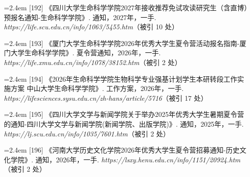 {\vspace{0.6pt}
\vspace{3.5pt}\par
\nopagebreak\vspace{1pt}
\noindent\hangindent=2.4em \label{src:S0245}{\color{cAccent}[192]} 《四川大学生命科学学院2027年接收推荐免试攻读研究生（含直博）预报名通知-生命科学学院》. 通知，2027年，一手. \textit{https://life.scu.edu.cn/info/1063/5455.htm}（被引 10 处）\par
\vspace{0.6pt}
\vspace{3.5pt}\par
\nopagebreak\vspace{1pt}
\noindent\hangindent=2.4em \label{src:S0246}{\color{cAccent}[193]} 《厦门大学生命科学学院2026年优秀大学生夏令营活动报名指南-厦门大学生命科学学院》. 夏令营通知，2026年，一手. \textit{https://life.xmu.edu.cn/info/1078/38152.htm}（被引 2 处）\par
\vspace{0.6pt}
\vspace{3.5pt}\par
\nopagebreak\vspace{1pt}
\noindent\hangindent=2.4em \label{src:S0248}{\color{cAccent}[194]} 《2026年生命科学学院生物科学专业强基计划学生本研转段工作实施方案 \textbar{} 中山大学生命科学学院》. 工作方案，2026年，一手. \textit{https://lifesciences.sysu.edu.cn/zh-hans/article/5716}（被引 17 处）\par
\vspace{0.6pt}
\vspace{3.5pt}\par
\nopagebreak\vspace{1pt}
\noindent\hangindent=2.4em \label{src:S0249}{\color{cAccent}[195]} 《四川大学文学与新闻学院关于举办2025年优秀大学生暑期夏令营的通知-四川大学文学与新闻学院(新闻学院、出版学院)》. 通知，2025年，一手. \textit{https://lj.scu.edu.cn/info/1035/7601.htm}（被引 2 处）\par
\vspace{0.6pt}
\vspace{3.5pt}\par
\nopagebreak\vspace{1pt}
\noindent\hangindent=2.4em \label{src:S0250}{\color{cAccent}[196]} 《河南大学历史文化学院2026年优秀大学生夏令营招募通知-历史文化学院》. 通知，2026年，一手. \textit{https://lsxy.henu.edu.cn/info/1151/20924.htm}（被引 2 处）\par
}
